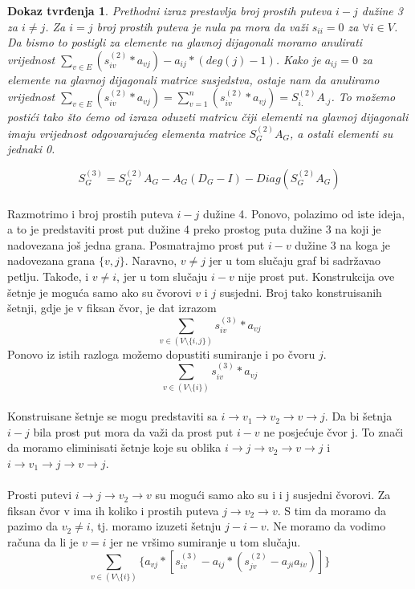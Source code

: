 \documentclass[11pt]{article}
\newtheorem*{custom_proof}{Dokaz tvrđenja}
\begin{document}
\begin{custom_proof}
			Prethodni izraz prestavlja broj prostih puteva $i-j$ dužine 3 za $i \neq j$. 
			Za $i = j$ broj prostih puteva je nula pa mora da važi $s_{ii} = 0$ za $\forall i \in V$. 
			Da bismo to postigli za elemente na glavnoj dijagonali moramo anulirati vrijednost $\sum_{v \in E} (s_{iv}^{(2)} * a_{vj}) - a_{ij} * (deg(j)  - 1)$.
			Kako je $a_{ij} = 0$ za elemente na glavnoj dijagonali matrice susjedstva, ostaje nam da anuliramo vrijednost $\sum_{v \in E} (s_{iv}^{(2)}*a_{vj}) = \sum_{v = 1}^{n} (s_{iv}^{(2)}*a_{vj}) = S_{i.}^{(2)} A_{.j}$.
			To možemo postići tako što ćemo od izraza oduzeti matricu čiji elementi na glavnoj dijagonali imaju vrijednost odgovarajućeg elementa matrice $S_G^{(2)} A_G$, a ostali elementi su jednaki 0.
			
			\[
				S_G^{(3)} = S_G^{(2)} A_G - A_G (D_G - I) - Diag(S_G^{(2)} A_G)
			\]
			\end{custom_proof}
	
			\paragraph{}
			Razmotrimo i broj prostih puteva $i-j$ dužine 4. Ponovo, polazimo od iste ideja, a to je predstaviti prost put dužine 4 preko prostog puta dužine 3 na koji je nadovezana još jedna grana.
			Posmatrajmo prost put $i-v$ dužine 3 na koga je nadovezana grana $\{v,j\}$. Naravno, $v \neq j$ jer u tom slučaju graf bi sadržavao petlju. Takođe, i $v \neq i$, jer u tom slučaju $i-v$ nije prost put.
			Konstrukcija ove šetnje je moguća samo ako su čvorovi $v$ i $j$ susjedni. Broj tako konstruisanih šetnji, gdje je v fiksan čvor, je dat izrazom
			\[
				\sum_{v \in  (V \setminus \{i,j\})} s_{iv}^{(3)} * a_{vj}
			\]
			Ponovo iz istih razloga možemo dopustiti sumiranje i po čvoru $j$.
			\[
				\sum_{v \in (V \setminus \{i\})} s_{iv}^{(3)} * a_{vj}
			\]

			\paragraph{}
			Konstruisane šetnje se mogu predstaviti sa $i \rightarrow v_1 \rightarrow v_2 \rightarrow v \rightarrow j$. 
			Da bi šetnja $i-j$ bila prost put mora da važi da prost put $i-v$ ne posjećuje čvor j.
			To znači da moramo eliminisati šetnje koje su oblika $i \rightarrow j \rightarrow v_2 \rightarrow v \rightarrow j$ i $i \rightarrow v_1 \rightarrow j \rightarrow v \rightarrow j$. 
	
			\paragraph{}
			Prosti putevi $i \rightarrow j \rightarrow v_2 \rightarrow v$ su mogući samo ako su i i j susjedni čvorovi. Za fiksan čvor v ima ih koliko i prostih puteva $j \rightarrow v_2 \rightarrow v$. 
			S tim da moramo da pazimo da $v_2 \neq i$, tj. moramo izuzeti šetnju $j-i-v$. Ne moramo da vodimo računa da li je $v=i$ jer ne vršimo sumiranje u tom slučaju.
			\[
				\sum_{v \in (V \setminus \{i\})} \{a_{vj} * [s_{iv}^{(3)} - a_{ij} * (s_{jv}^{(2)} - a_{ji}a_{iv})]\}
			\]
		
\end{document}
